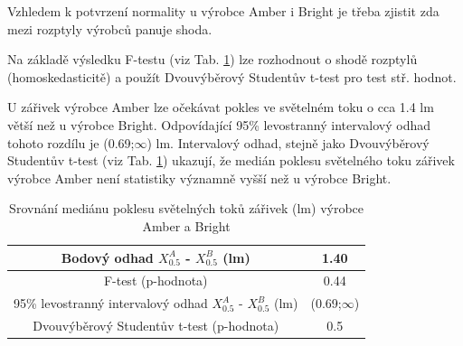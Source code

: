 \documentclass[czech]{article}%
\begin{document}
Vzhledem k potvrzení normality u výrobce Amber i Bright je třeba zjistit zda mezi rozptyly výrobců panuje shoda.

Na základě výsledku F-testu (viz Tab. \ref{tab:medianStudent}) lze rozhodnout o shodě rozptylů (homoskedasticitě) a použít 
Dvouvýběrový Studentův t-test pro test stř. hodnot.

U zářivek výrobce Amber lze očekávat pokles ve světelném toku o cca 1.4 lm větší než u výrobce Bright. 
Odpovídající 95\% levostranný intervalový odhad tohoto rozdílu je (0.69;$\infty$) lm.
Intervalový odhad, stejně jako Dvouvýběrový Studentův t-test (viz Tab. \ref{tab:medianStudent}) ukazují, že medián 
poklesu světelného toku zářivek výrobce Amber není statistiky významně vyšší než u výrobce Bright.

\begin{table}[H]
	\centering
	\caption{Srovnání mediánu poklesu světelných toků zářivek (lm) výrobce Amber a Bright}
	\label{tab:medianStudent}
    \begin{tabular}{c|c}
        Bodový odhad $X_{0.5}^A$ - $X_{0.5}^B$ (lm)                                   & 1.40        \\
        \hline
        F-test (p-hodnota)                                                    & 0.44        \\
        \hline
        95\% levostranný intervalový odhad $X_{0.5}^A$ - $X_{0.5}^B$ (lm)     & (0.69;$\infty$)  \\
        \hline
        Dvouvýběrový Studentův t-test (p-hodnota)                             & 0.5         \\
    \end{tabular}
\end{table}
\end{document}
